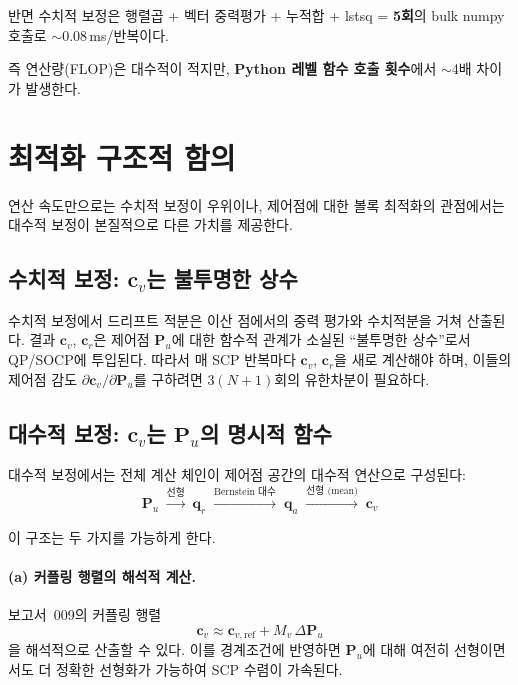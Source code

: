 \documentclass[11pt]{article}
\begin{document}
반면 수치적 보정은 행렬곱 + 벡터 중력평가 + 누적합 + lstsq =
\textbf{5회}의 bulk numpy 호출로 $\sim$0.08\,ms/반복이다.

즉 연산량(FLOP)은 대수적이 적지만, \textbf{Python 레벨 함수 호출 횟수}에서
$\sim$4배 차이가 발생한다.


\section{최적화 구조적 함의}
\label{sec:structure}

연산 속도만으로는 수치적 보정이 우위이나,
제어점에 대한 볼록 최적화의 관점에서는 대수적 보정이
본질적으로 다른 가치를 제공한다.

\subsection{수치적 보정: $\mathbf{c}_v$는 불투명한 상수}

수치적 보정에서 드리프트 적분은 이산 점에서의 중력 평가와 수치적분을
거쳐 산출된다.
결과 $\mathbf{c}_v$, $\mathbf{c}_r$은 제어점 $\mathbf{P}_u$에 대한
함수적 관계가 소실된 ``불투명한 상수''로서 QP/SOCP에 투입된다.
따라서 매 SCP 반복마다 $\mathbf{c}_v$, $\mathbf{c}_r$을 새로 계산해야 하며,
이들의 제어점 감도 $\partial \mathbf{c}_v / \partial \mathbf{P}_u$를
구하려면 $3(N+1)$회의 유한차분이 필요하다.

\subsection{대수적 보정: $\mathbf{c}_v$는 $\mathbf{P}_u$의 명시적 함수}

대수적 보정에서는 전체 계산 체인이 제어점 공간의 대수적 연산으로 구성된다:
\[
  \mathbf{P}_u \;\xrightarrow{\text{선형}}\;
  \mathbf{q}_r \;\xrightarrow{\text{Bernstein 대수}}\;
  \mathbf{q}_{a} \;\xrightarrow{\text{선형 (mean)}}\;
  \mathbf{c}_v
\]

이 구조는 두 가지를 가능하게 한다.

\paragraph{(a) 커플링 행렬의 해석적 계산.}
보고서~009\cite{report009}의 커플링 행렬
\begin{equation}
  \mathbf{c}_v \approx \mathbf{c}_{v,\mathrm{ref}} + M_v \, \Delta\mathbf{P}_u
  \label{eq:coupling}
\end{equation}
을 해석적으로 산출할 수 있다.
이를 경계조건에 반영하면 $\mathbf{P}_u$에 대해 여전히 선형이면서도
더 정확한 선형화가 가능하여 SCP 수렴이 가속된다.
\end{document}
